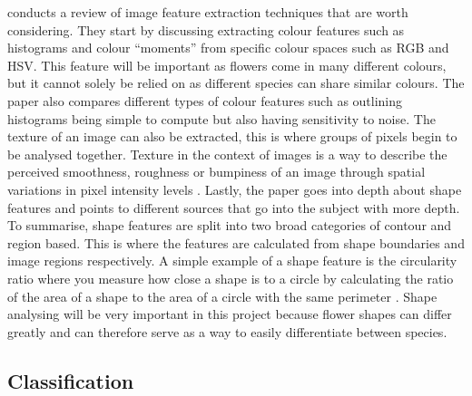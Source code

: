 \documentclass[12pt,a4paper]{report}
\begin{document}
\citet{tian2013} conducts a review of image feature extraction techniques that are worth considering. They 
start by discussing extracting colour features such as histograms and colour “moments” from specific colour spaces 
such as RGB and HSV. This feature will be important as flowers come in many different colours, but it 
cannot solely be relied on as different species can share similar colours. The paper also compares different types of colour features such as outlining histograms being simple to 
compute but also having sensitivity to noise. The texture of an image can also be extracted, this is where 
groups of pixels begin to be analysed together. Texture in the 
context of images is a way to describe the perceived smoothness, roughness or bumpiness of an image through spatial 
variations in pixel intensity levels \citep{mathworks}. Lastly, the paper goes into depth about shape features and 
points to different sources that go into the subject with more depth. To summarise, shape features are 
split into two broad categories of contour and region based. This is where the features are calculated from shape 
boundaries and image regions respectively. A simple example of a shape feature is the circularity ratio where you measure 
how close a shape is to a circle by calculating the ratio of the area of a shape to the area of a circle with the same 
perimeter \citep{mingqiang2008survey}. Shape analysing will be very important in this project because flower shapes can
differ greatly and can therefore serve as a way to easily differentiate between species.

\subsection{Classification}
\end{document}
